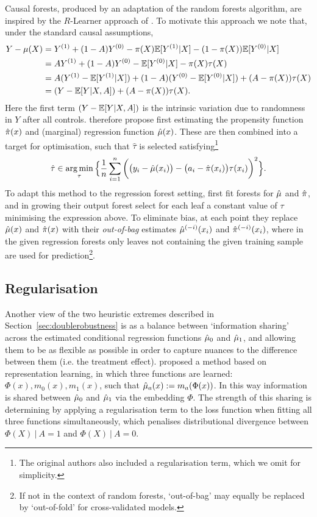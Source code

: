 \documentclass[../thesis.tex]{subfiles}
\begin{document}
Causal forests, produced by an adaptation of the random forests algorithm, are inspired by the $R$-Learner approach of \citet{nie_learning_2017}. To motivate this approach we note that, under the standard causal assumptions,
\begin{align*} 
Y - \mu(X) & = Y^{(1)} + (1-A)Y^{(0)} - \pi(X)\mathbb{E}[Y^{(1)}|X] - (1-\pi(X))\mathbb{E}[Y^{(0)}|X]
\\  
& = AY^{(1)} + (1-A)Y^{(0)}- \mathbb{E}[Y^{(0)}|X] - \pi(X)\tau(X) \\
& = A(Y^{(1)} - \mathbb{E}[Y^{(1)}|X]) + (1-A)(Y^{(0)}- \mathbb{E}[Y^{(0)}|X]) + (A-\pi(X))\tau(X) \\
& = (Y - \mathbb{E}[Y|X,A]) + (A-\pi(X))\tau(X).
\end{align*}
Here the first term $(Y-\mathbb{E}[Y|X,A])$ is the intrinsic variation due to randomness in $Y$ after all controls. \citet{nie_learning_2017} therefore propose first estimating the propensity function $\hat{\pi}(x)$ and (marginal) regression function $\hat{\mu}(x)$. These are then combined into a target for optimisation, such that $\hat{\tau}$ is selected satisfying\footnote{The original authors also included a regularisation term, which we omit for simplicity.} 
\[\hat{\tau} \in \operatorname*{arg\,min}_{\tau} \Big\{\frac{1}{n}\sum_{i=1}^{n} \bigg( \big(y_i - \hat{\mu}(x_i)\big) - \big(a_i - \hat{\pi}(x_i)\big)\tau(x_i)\bigg)^2  \Big\}.\]
To adapt this method to the regression forest setting, \citet{athey_generalized_2019} first fit forests for $\hat{\mu}$ and $\hat{\pi}$, and in growing their output forest select for each leaf a constant value of $\tau$ minimising the expression above. To eliminate bias, at each point they replace $\hat{\mu}(x)$ and $\hat{\pi}(x)$ with their \emph{out-of-bag} estimates $\hat{\mu}^{(-i)}(x_i)$ and $\hat{\pi}^{(-i)}(x_i)$, where in the given regression forests only leaves not containing the given training sample are used for prediction\footnote{If not in the context of random forests, `out-of-bag' may equally be replaced by `out-of-fold' for cross-validated models.}.


\subsection{Regularisation} \label{sec:regularisation_hte}
Another view of the two heuristic extremes described in Section~\ref{sec:doublerobustness} is as a balance between  `information sharing' across the estimated conditional regression functions $\hat{\mu}_0$ and $\hat{\mu}_1$, and allowing them to be as flexible as possible in order to capture nuances to the difference between them (i.e. the treatment effect). \citet{shalit_estimating_2017} proposed a method based on representation learning, in which three functions are learned: $\Phi(x), m_0(x), m_1(x)$, such that $\hat{\mu}_a(x) := m_a(\Phi(x))$. In this way information is shared between $\hat{\mu}_0$ and $\hat{\mu}_1$ via the embedding $\Phi$. The strength of this sharing is determining by applying a regularisation term to the loss function when fitting all three functions simultaneously, which penalises distributional divergence between $\Phi(X) \ | \ A = 1$ and $\Phi(X)  \ | \ A = 0$. 
\end{document}
